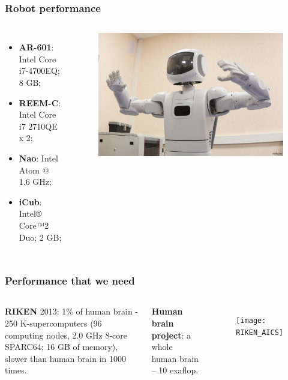 \documentclass[12pt, aspectratio=169]{beamer}
\begin{document}
\begin{frame}
\frametitle{Robot performance}
\begin{columns}[c] %
\begin{itemize}
\item \textbf{AR-601}: Intel Core i7-4700EQ; 8 GB;
\item \textbf{REEM-C}: Intel Core i7 2710QE x 2;
\item \textbf{Nao}: Intel Atom @ 1.6 GHz;
\item \textbf{iCub}: Intel® Core™2 Duo; 2 GB;
\end{itemize}

\begin{figure}
\includegraphics[width=1.0\linewidth]{AR-601}
\end{figure}
\end{columns}
\end{frame}


\begin{frame}
\frametitle{Performance that we need}
\begin{columns}[c] %
\textbf{RIKEN} 2013: 1\% of human brain - 250 K-supercomputers
(96 computing nodes, 2.0 GHz 8-core SPARC64; 16 GB of memory), slower than human brain in 1000 times.

\textbf{Human brain project}: a whole human brain -- 10 exaflop.

\begin{figure}
\texttt{[image: RIKEN\_AICS]}
\end{figure}
\end{columns}
\end{frame}
\end{document}
